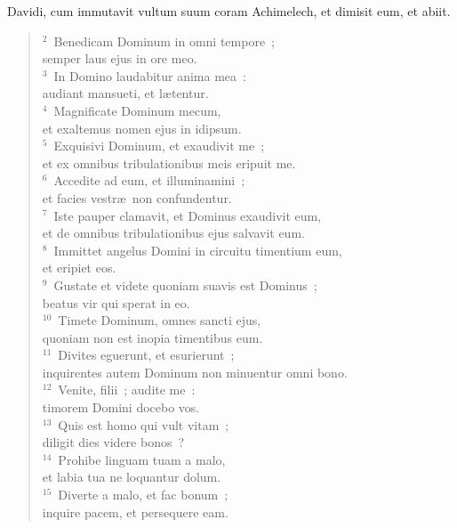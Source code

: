 \lettrine[lines=3,image=true,loversize=0.05,lraise=-0.03]{D}{}avidi, cum immutavit vultum suum coram Achimelech, et dimisit eum, et abiit.
\begin{flushleft}\begin{verse}\vspace{6pt}${}^{2}$~Benedicam Dominum in omni tempore~;\\ semper laus ejus in ore meo.\\
${}^{3}$~In Domino laudabitur anima mea~:\\ audiant mansueti, et l\ae tentur.\\
${}^{4}$~Magnificate Dominum mecum,\\ et exaltemus nomen ejus in idipsum.\\
${}^{5}$~Exquisivi Dominum, et exaudivit me~;\\ et ex omnibus tribulationibus meis eripuit me.\\
${}^{6}$~Accedite ad eum, et illuminamini~;\\ et facies vestr\ae\ non confundentur.\\
${}^{7}$~Iste pauper clamavit, et Dominus exaudivit eum,\\ et de omnibus tribulationibus ejus salvavit eum.\\
${}^{8}$~Immittet angelus Domini in circuitu timentium eum,\\ et eripiet eos.\\
${}^{9}$~Gustate et videte quoniam suavis est Dominus~;\\ beatus vir qui sperat in eo.\\
${}^{10}$~Timete Dominum, omnes sancti ejus,\\ quoniam non est inopia timentibus eum.\\
${}^{11}$~Divites eguerunt, et esurierunt~;\\ inquirentes autem Dominum non minuentur omni bono.\\
${}^{12}$~Venite, filii~; audite me~:\\ timorem Domini docebo vos.\\
${}^{13}$~Quis est homo qui vult vitam~;\\ diligit dies videre bonos~?\\
${}^{14}$~Prohibe linguam tuam a malo,\\ et labia tua ne loquantur dolum.\\
${}^{15}$~Diverte a malo, et fac bonum~;\\ inquire pacem, et persequere eam.\\

\end{verse}
\end{flushleft}
